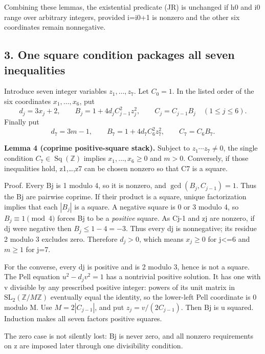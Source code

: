 Combining these lemmas, the existential predicate (JR) is unchanged if
h0 and i0 range over arbitrary integers, provided i=i0+1 is nonzero and
the other six coordinates remain nonnegative.

\hypertarget{one-square-condition-packages-all-seven-inequalities}{%
\subsection{3. One square condition packages all seven
inequalities}\label{one-square-condition-packages-all-seven-inequalities}}

Introduce seven integer variables \(z_1,\ldots,z_7\). Let \(C_0=1\). In
the listed order of the six coordinates \(x_1,\ldots,x_6\), put \[
 d_j=3x_j+2,\qquad
 B_j=1+4d_jC_{j-1}^2z_j^2,\qquad C_j=C_{j-1}B_j
 \quad(1\le j\le6).
\] Finally put \[
 d_7=3m-1,\qquad B_7=1+4d_7C_6^2z_7^2,\qquad C_7=C_6B_7.
 \tag{3}
\]

\textbf{Lemma 4 (coprime positive-square stack).} Subject to
\(z_1\cdots z_7\ne0\), the single condition
\(C_7\in\operatorname{Sq}(\mathbb Z)\) implies \(x_1,\ldots,x_6\ge0\)
and \(m>0\). Conversely, if those inequalities hold, z1,\ldots,z7 can be
chosen nonzero so that C7 is a square.

Proof. Every Bj is 1 modulo 4, so it is nonzero, and
\(\gcd(B_j,C_{j-1})=1\). Thus the Bj are pairwise coprime. If their
product is a square, unique factorization implies that each \(|B_j|\) is
a square. A negative square is 0 or 3 modulo 4, so \(B_j\equiv1\pmod4\)
forces Bj to be a \emph{positive} square. As Cj-1 and zj are nonzero, if
dj were negative then \(B_j\le1-4=-3\). Thus every dj is nonnegative;
its residue 2 modulo 3 excludes zero. Therefore \(d_j>0\), which means
\(x_j\ge0\) for j\textless=6 and \(m\ge1\) for j=7.

For the converse, every dj is positive and is 2 modulo 3, hence is not a
square. The Pell equation \(u^2-d_jv^2=1\) has a nontrivial positive
solution. It has one with v divisible by any prescribed positive
integer: powers of its unit matrix in
\(\mathrm{SL}_2(\mathbb Z/M\mathbb Z)\) eventually equal the identity,
so the lower-left Pell coordinate is 0 modulo M. Use \(M=2|C_{j-1}|\),
and put \(z_j=v/(2C_{j-1})\). Then Bj is u squared. Induction makes all
seven factors positive squares.

The zero case is not silently lost: Bj is never zero, and all nonzero
requirements on z are imposed later through one divisibility condition.


